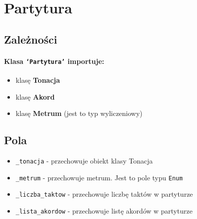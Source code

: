 \documentclass[dokumentacja.tex]{subfiles}
\begin{document}
\section{Partytura}

\subsection{Zależności}

\paragraph*{Klasa \texttt{`Partytura'} importuje:}
\begin{itemize}
    \item klasę \textbf{Tonacja}
    \item klasę \textbf{Akord}
    \item klasę \textbf{Metrum} (jest to typ wyliczeniowy)
\end{itemize}

\subsection{Pola}
\begin{itemize}
    \item \texttt{\_tonacja} - przechowuje obiekt klasy Tonacja
    \item \texttt{\_metrum} - przechowuje metrum. Jest to pole typu \texttt{Enum}
    \item \texttt{\_liczba\_taktow} - przechowuje liczbę taktów w partyturze
    \item \texttt{\_lista\_akordow} - przechowuje listę akordów w partyturze
\end{itemize}
\end{document}
